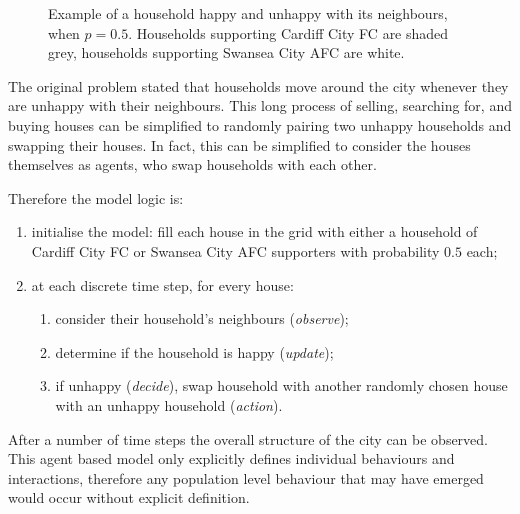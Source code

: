 \begin{figure}
    \begin{center}
        \subfigure[A happy household, with 6 similar neighbours (\(\frac{6}{8} > p = 0.5\))]{}
        \subfigure[An unhappy household, with 2 similar neighbours (\(\frac{2}{8} < p = 0.5\))]{}
    \end{center}
    \caption{Example of a household happy and unhappy with its neighbours, when
    \(p=0.5\). Households supporting Cardiff City FC are shaded grey, households
    supporting Swansea City AFC are white.}
    \label{fig:schelling_happyunhappy}
\end{figure}

The original problem stated that households move around the city
whenever they are unhappy with their neighbours.
This long process of selling, searching for, and buying houses can be simplified
to randomly pairing two unhappy households and swapping their houses.
In fact, this can be simplified to consider the houses themselves as agents,
who swap households with each other.

Therefore the model logic is:

\begin{enumerate}
  \item initialise the model: fill each house in the grid with either a
  household of Cardiff City FC or Swansea City AFC supporters with
  probability \(0.5\) each;
  \item at each discrete time step, for every house:
  \begin{enumerate}
    \item consider their household's neighbours (\textit{observe});
    \item determine if the household is happy (\textit{update});
    \item if unhappy (\textit{decide}), swap household with another randomly
    chosen house with an unhappy household (\textit{action}).
  \end{enumerate}
\end{enumerate}

After a number of time steps the overall structure of the city can be observed.
This agent based model only explicitly defines individual behaviours
and interactions, therefore any population level behaviour that may have emerged
would occur without explicit definition.

